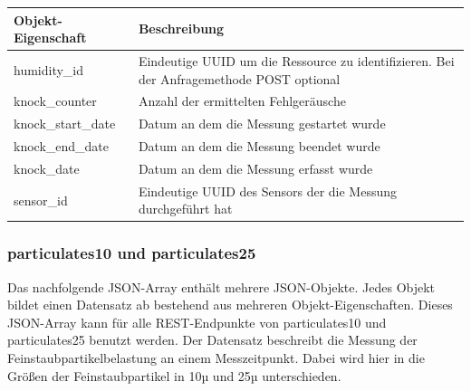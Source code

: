 \begin{table}[H]
  \begin{tabularx}{\textwidth}{lX}
    \textbf{Objekt-Eigenschaft} & \textbf{Beschreibung}                                                                     \\ \toprule
    humidity\_id                & Eindeutige UUID um die Ressource zu identifizieren. Bei der Anfragemethode POST optional  \\
    knock\_counter              & Anzahl der ermittelten Fehlgeräusche                                                      \\
    knock\_start\_date          & Datum an dem die Messung gestartet wurde                                                  \\
    knock\_end\_date            & Datum an dem die Messung beendet wurde                                                    \\
    knock\_date                 & Datum an dem die Messung erfasst wurde                                                    \\
    sensor\_id                  & Eindeutige UUID des Sensors der die Messung durchgeführt hat                              \\
  \end{tabularx}
\end{table}

\subsubsection{particulates10 und particulates25}%
\label{sec:rest.json.particulates}
Das nachfolgende JSON-Array enthält mehrere JSON-Objekte. Jedes Objekt bildet einen Datensatz ab bestehend aus mehreren Objekt-Eigenschaften. Dieses JSON-Array kann für alle REST-Endpunkte von particulates10 und particulates25 benutzt werden. Der Datensatz beschreibt die Messung der Feinstaubpartikelbelastung an einem Messzeitpunkt. Dabei wird hier in die Größen der Feinstaubpartikel in 10µ und 25µ unterschieden.

\begin{jsoncode}
\end{jsoncode}


